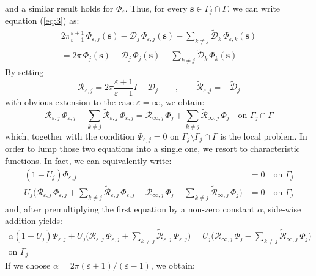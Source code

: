 \documentclass[12pt,letterpaper,oneside]{article}
\theoremstyle{definition}
\begin{document}
and a similar result holds for $\Phi_\varepsilon$. Thus, for every $\boldsymbol{s} \in \Gamma_j \cap \Gamma$, we can write equation (\ref{eq:3}) as:
\begin{multline*}
2 \pi \frac{\varepsilon + 1}{\varepsilon - 1} \, \Phi_{\varepsilon,j}(\boldsymbol{s}) -  \mathcal{D}_j \, \Phi_{\varepsilon,j}(\boldsymbol{s}) - \sum_{k \ne j} \tilde{\mathcal{D}}_k \, \Phi_{\varepsilon,k}(\boldsymbol{s}) \\
= 2 \pi  \, \Phi_j(\boldsymbol{s}) -  \mathcal{D}_j \, \Phi_j(\boldsymbol{s}) - \sum_{k \ne j} \tilde{\mathcal{D}}_k \, \Phi_k(\boldsymbol{s})
\end{multline*}
By setting
\[
{\mathcal{R}}_{\varepsilon,j} = 2 \pi \frac{\varepsilon + 1}{\varepsilon - 1} I - {\mathcal{D}}_j \qquad , \qquad
\tilde{\mathcal{R}}_{\varepsilon,j} =  - \tilde{\mathcal{D}}_j
\]
with obvious extension to the case $\varepsilon = \infty$, we obtain:
\[
{\mathcal{R}}_{\varepsilon,j} \, \Phi_{\varepsilon,j} + \sum_{k \ne j} \tilde{\mathcal{R}}_{\varepsilon,j} \, \Phi_{\varepsilon,j} = {\mathcal{R}}_{\infty,j} \, \Phi_{j} + \sum_{k \ne j} \tilde{\mathcal{R}}_{\infty,j} \, \Phi_{j} \quad \text{on }\Gamma_j \cap \Gamma
\]
which, together with the condition $\Phi_{\varepsilon,j} = 0$ on $\Gamma_j \setminus \Gamma_j \cap \Gamma$ is the local problem. In order to lump those two equations into a single one, we resort to characteristic functions. In fact, we can equivalently write:
\begin{align*}
(1 - U_j)\Phi_{\varepsilon,j} & = 0 \quad \text{on }\Gamma_j \\
U_j \bigg( {\mathcal{R}}_{\varepsilon,j} \, \Phi_{\varepsilon,j} + \sum_{k \ne j} \tilde{\mathcal{R}}_{\varepsilon,j} \, \Phi_{\varepsilon,j} - {\mathcal{R}}_{\infty,j} \, \Phi_{j} - \sum_{k \ne j} \tilde{\mathcal{R}}_{\infty,j} \, \Phi_{j} \bigg) & = 0 \quad \text{on }\Gamma_j
\end{align*}
and, after premultiplying the first equation by a non-zero constant $\alpha$, side-wise addition yields:
\begin{multline*}
\alpha(1 - U_j)\Phi_{\varepsilon,j} + U_j \bigg( {\mathcal{R}}_{\varepsilon,j} \, \Phi_{\varepsilon,j} + \sum_{k \ne j} \tilde{\mathcal{R}}_{\varepsilon,j} \, \Phi_{\varepsilon,j}\bigg) = U_j \bigg( {\mathcal{R}}_{\infty,j} \, \Phi_{j} - \sum_{k \ne j} \tilde{\mathcal{R}}_{\infty,j} \, \Phi_{j} \bigg)\\ \text{on }\Gamma_j
\end{multline*}
If we choose $\alpha = 2\pi(\varepsilon + 1)/(\varepsilon - 1)$, we obtain:
\end{document}
